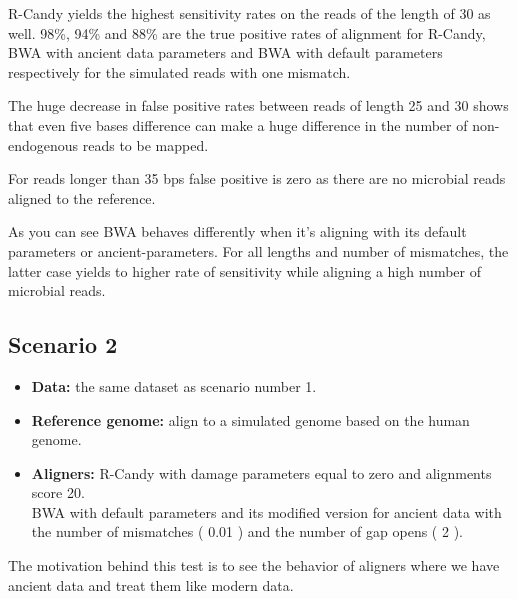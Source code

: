 \documentclass[11pt,a4paper]{report}
\begin{document}

R-Candy yields the highest sensitivity rates on the reads of the length of 30 as well. 
98\%, 94\% and 88\% are the true positive rates of alignment for R-Candy, 
BWA with ancient data parameters and BWA with default parameters respectively 
for the simulated reads with one mismatch. 

The huge decrease in false positive rates between reads of length 25 and 30 
shows that even five bases difference can make a huge difference in the number of 
non-endogenous reads to be mapped.

For reads longer than 35 bps false positive is zero as there are no microbial 
reads aligned to the reference.

As you can see BWA behaves differently when it's aligning with its default 
parameters or ancient-parameters. For all lengths and number of mismatches, the 
latter case yields to higher rate of sensitivity while aligning a high number of 
microbial reads.

\subsection{Scenario 2}

 
 \begin{itemize}
   \item \textbf{Data:} the same dataset as scenario number 1.
   
   \item \textbf{Reference genome:} align to a simulated genome based
 on the human genome.

    \item \textbf{Aligners:} R-Candy with damage parameters equal to zero and 
    alignments score 20. \\
BWA with default parameters and its modified version for ancient data with the 
number of mismatches ( 0.01 ) and the number of gap opens ( 2 ).
  
  \end{itemize}
 
The motivation behind this test is to see the behavior of aligners
where we have ancient data and treat them like modern data.
\end{document}
